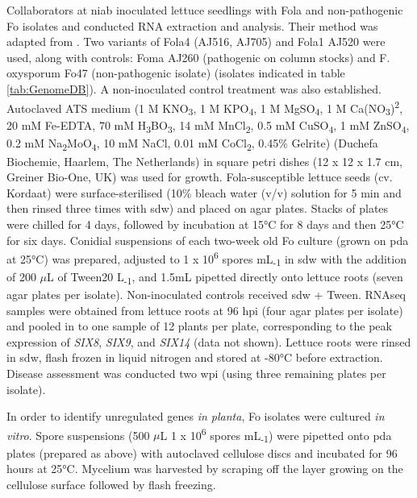 Collaborators at \ac{niab} inoculated lettuce seedlings with \ac{Fola} and non-pathogenic \ac{Fo} isolates and conducted RNA extraction and analysis. Their method was adapted from \textcite{Taylor2016}. Two variants of Fola4 (AJ516, AJ705) and Fola1 AJ520 were used, along with controls: Foma AJ260 (pathogenic on column stocks) and F. oxysporum Fo47 (non-pathogenic isolate) (isolates indicated in table \ref{tab:GenomeDB}). A non-inoculated control treatment was also established. Autoclaved ATS medium (1 M KNO\textsubscript{3}, 1 M KPO\textsubscript{4}, 1 M MgSO\textsubscript{4}, 1 M Ca(NO\textsubscript{3})\textsuperscript{2}, 20 mM Fe-EDTA, 70 mM H\textsubscript{3}BO\textsubscript{3}, 14 mM MnCl\textsubscript{2}, 0.5 mM CuSO\textsubscript{4}, 1 mM ZnSO\textsubscript{4}, 0.2 mM Na\textsubscript{2}MoO\textsubscript{4}, 10 mM NaCl, 0.01 mM CoCl\textsubscript{2}, 0.45\% Gelrite) (Duchefa Biochemie, Haarlem, The Netherlands) in square petri dishes (12 x 12 x 1.7 cm, Greiner Bio-One, UK) was used for growth. \ac{Fola}-susceptible lettuce seeds (cv. Kordaat) were surface-sterilised (10\% bleach water (v/v) solution for 5 min and then rinsed three times with \ac{sdw}) and placed on agar plates. Stacks of plates were chilled for 4 days, followed by incubation at 15°C for 8 days and then 25°C for six days. Conidial suspensions of each two-week old \ac{Fo} culture (grown on \ac{pda} at 25°C) was prepared, adjusted to 1 x 10\textsuperscript{6} spores mL\textsubscript{-1} in \ac{sdw} with the addition of 200 \(\mu\)L of Tween20 L\textsubscript{-1}, and 1.5mL pipetted directly onto lettuce roots (seven agar plates per isolate). Non-inoculated controls received \ac{sdw} + Tween. RNAseq samples were obtained from lettuce roots at 96 \ac{hpi} (four agar plates per isolate) and pooled in to one sample of 12 plants per plate, corresponding to the peak expression of \textit{SIX8}, \textit{SIX9}, and \textit{SIX14} (data not shown). Lettuce roots were rinsed in \ac{sdw}, flash frozen in liquid nitrogen and stored at -80°C before extraction. Disease assessment was conducted two \ac{wpi} (using three remaining plates per isolate).

In order to identify unregulated genes \textit{in planta}, \ac{Fo} isolates were cultured \textit{in vitro}. Spore suspensions (500 \(\mu\)L 1 x 10\textsuperscript{6} spores mL\textsubscript{-1}) were pipetted onto \ac{pda} plates (prepared as above) with autoclaved cellulose discs and incubated for 96 hours at 25°C. Mycelium was harvested by scraping off the layer growing on the cellulose surface followed by flash freezing. 

